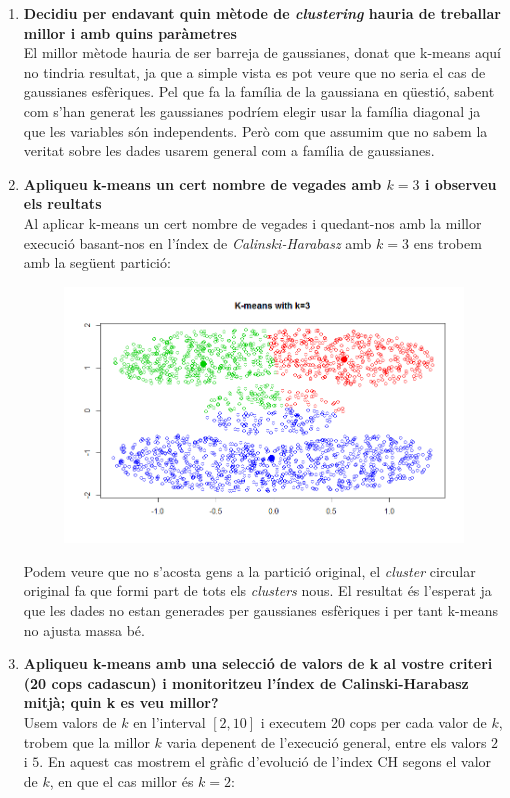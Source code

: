 \documentclass[a4paper]{article}
\begin{document}
 \begin{enumerate}
 	\item \textbf{ Decidiu per endavant quin mètode de \textit{clustering} hauria de treballar millor i amb quins paràmetres} \\
 	El millor mètode hauria de ser barreja de gaussianes, donat que k-means aquí no tindria resultat, ja que a simple vista es pot veure que no seria el cas de gaussianes esfèriques. Pel que fa la família de la gaussiana en qüestió, sabent com s'han generat les gaussianes podríem elegir usar la família diagonal ja que les variables són independents. Però com que assumim que no sabem la veritat sobre les dades usarem general com a família de gaussianes.

 	\item \textbf{Apliqueu k-means un cert nombre de vegades amb $k = 3$ i observeu els reultats}\\
 	Al aplicar k-means un cert nombre de vegades i quedant-nos amb la millor execució basant-nos en l'índex de \textit{Calinski-Harabasz } amb $k = 3$ ens trobem amb la següent partició:
	 
	\begin{figure}[H]
	\centering
 	\includegraphics[scale=0.5]{3kmeans}
	\end{figure}
 	Podem veure que no s'acosta gens a la partició original, el \textit{cluster} circular original fa que formi part de tots els \textit{clusters} nous. El resultat és l'esperat ja que les dades no estan generades per gaussianes esfèriques i per tant k-means no ajusta massa bé.
 	
 	\item \textbf{Apliqueu k-means amb una selecció de valors de k al vostre criteri (20 cops cadascun) i monitoritzeu l'índex de Calinski-Harabasz mitjà; quin k es veu millor?} \\
    Usem valors de $k$ en l'interval $[2,10]$ i executem 20 cops per cada valor de $k$, trobem que la millor $k$ varia depenent de l'execució general, entre els valors $2$ i $5$. En aquest cas mostrem el gràfic d'evolució de l'index CH segons el valor de $k$, en que el cas millor és $k = 2$:
    

\end{enumerate}
\end{document}
